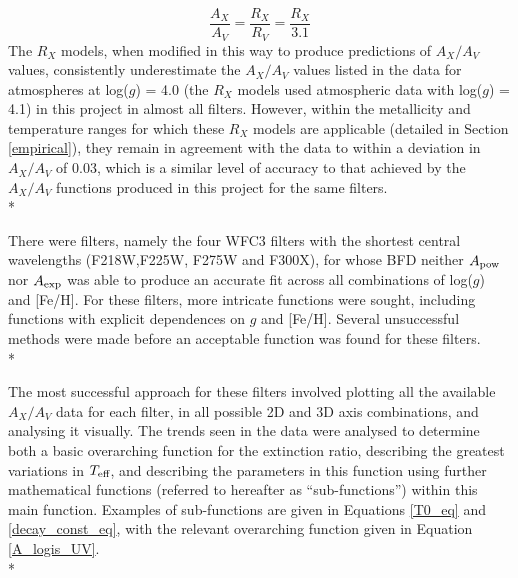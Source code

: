 \documentclass[12pt, a4paper]{report}
\begin{document}
\begin{equation}
\frac{A_{X}}{A_{V}} = \frac{R_{X}}{R_{V}} = \frac{R_{X}}{3.1}
\label{convert_Rx_to_Ax}
\end{equation}
The $R_{X}$ models, when modified in this way to produce predictions of $A_{X}/A_{V}$ values, consistently underestimate the $A_{X}/A_{V}$ values listed in the data for atmospheres at log($g$) = 4.0 (the $R_{X}$ models used atmospheric data with log($g$) = 4.1) in this project in almost all filters. However, within the metallicity and temperature ranges for which these $R_{X}$ models are applicable (detailed in Section \ref{empirical}), they remain in agreement with the data to within a deviation in $A_{X}/A_{V}$ of 0.03, which is a similar level of accuracy to that achieved by the $A_{X}/A_{V}$ functions produced in this project for the same filters.\\*

There were filters, namely the four WFC3 filters with the shortest central wavelengths (F218W,F225W, F275W and F300X), for whose BFD neither $A_{\textnormal{pow}}$ nor $A_{\textnormal{exp}}$ was able to produce an accurate fit across all combinations of log($g$) and [Fe/H]. For these filters, more intricate functions were sought, including functions with explicit dependences on $g$ and [Fe/H]. Several unsuccessful methods were made before an acceptable function was found for these filters.\\*

The most successful approach for these filters involved plotting all the available $A_{X}/A_{V}$ data for each filter, in all possible 2D and 3D axis combinations, and analysing it visually. The trends seen in the data were analysed to determine both a basic overarching function for the extinction ratio, describing the greatest variations in $T_{\textnormal{eff}}$, and describing the parameters in this function using further mathematical functions (referred to hereafter as ``sub-functions'') within this main function. Examples of sub-functions are given in Equations \ref{T0_eq} and \ref{decay_const_eq}, with the relevant overarching function given in Equation \ref{A_logis_UV}.\\*
\end{document}
